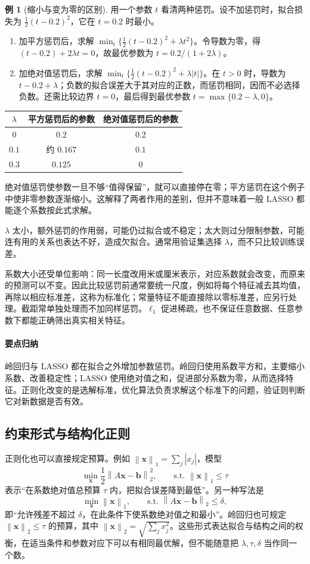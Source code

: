 \documentclass[UTF8,fontset=fandol,a4paper,12pt]{ctexart}
\newcommand{\vx}{\boldsymbol x}
\newcommand{\vb}{\boldsymbol b}
\newcommand{\norm}[1]{\left\lVert#1\right\rVert}
\theoremstyle{definition}
\newtheorem{example}[definition]{例}
\begin{document}
\begin{example}[缩小与变为零的区别]
用一个参数 $t$ 看清两种惩罚。设不加惩罚时，拟合损失为 $\frac12(t-0.2)^2$，它在 $t=0.2$ 时最小。
\begin{enumerate}
\item 加平方惩罚后，求解 $\min_t\{\frac12(t-0.2)^2+\lambda t^2\}$。令导数为零，得 $(t-0.2)+2\lambda t=0$，故最优参数为 $t=0.2/(1+2\lambda)$。
\item 加绝对值惩罚后，求解 $\min_t\{\frac12(t-0.2)^2+\lambda|t|\}$。在 $t>0$ 时，导数为 $t-0.2+\lambda$；负数的拟合误差大于其对应的正数，而惩罚相同，因而不必选择负数。还需比较边界 $t=0$，最后得到最优参数 $t=\max\{0.2-\lambda,0\}$。
\end{enumerate}
\begin{center}
\begin{tabular}{ccc}
\toprule
$\lambda$ & 平方惩罚后的参数 & 绝对值惩罚后的参数\\
\midrule
$0$ & $0.2$ & $0.2$\\
$0.1$ & 约 $0.167$ & $0.1$\\
$0.3$ & $0.125$ & $0$\\
\bottomrule
\end{tabular}
\end{center}
绝对值惩罚使参数一旦不够“值得保留”，就可以直接停在零；平方惩罚在这个例子中使非零参数逐渐缩小。这解释了两者作用的差别，但并不意味着一般 LASSO 都能逐个系数按此式求解。
\end{example}

$\lambda$ 太小，额外惩罚的作用弱，可能仍过拟合或不稳定；太大则过分限制参数，可能连有用的关系也表达不好，造成欠拟合。通常用验证集选择 $\lambda$，而不只比较训练误差。

系数大小还受单位影响：同一长度改用米或厘米表示，对应系数就会改变，而原来的预测可以不变。因此比较惩罚前通常要统一尺度，例如将每个特征减去其均值，再除以相应标准差，这称为标准化；常量特征不能直接除以零标准差，应另行处理。截距常单独处理而不加同样惩罚。$\ell_1$ 促进稀疏，也不保证任意数据、任意参数下都能正确筛出真实相关特征。

\paragraph{要点归纳}
岭回归与 LASSO 都在拟合之外增加参数惩罚。岭回归使用系数平方和，主要缩小系数、改善稳定性；LASSO 使用绝对值之和，促进部分系数为零，从而选择特征。正则化改变的是选解标准，优化算法负责求解这个标准下的问题，验证则判断它对新数据是否有效。

\subsection{约束形式与结构化正则}
正则化也可以直接规定预算。例如 $\norm{\vx}_1=\sum_j|x_j|$，模型
\[
 \min_{\vx}\frac12\norm{A\vx-\vb}_2^2,
 \qquad\text{s.t. }\norm{\vx}_1\le\tau
\]
表示“在系数绝对值总预算 $\tau$ 内，把拟合误差降到最低”。另一种写法是
\[
 \min_{\vx}\norm{\vx}_1,
 \qquad\text{s.t. }\norm{A\vx-\vb}_2\le\delta,
\]
即“允许残差不超过 $\delta$，在此条件下使系数绝对值之和最小”。岭回归也可规定 $\norm{\vx}_2\le\tau$ 的预算，其中 $\norm{\vx}_2=\sqrt{\sum_jx_j^2}$。这些形式表达拟合与结构之间的权衡，在适当条件和参数对应下可以有相同最优解，但不能随意把 $\lambda,\tau,\delta$ 当作同一个数。
\end{document}
